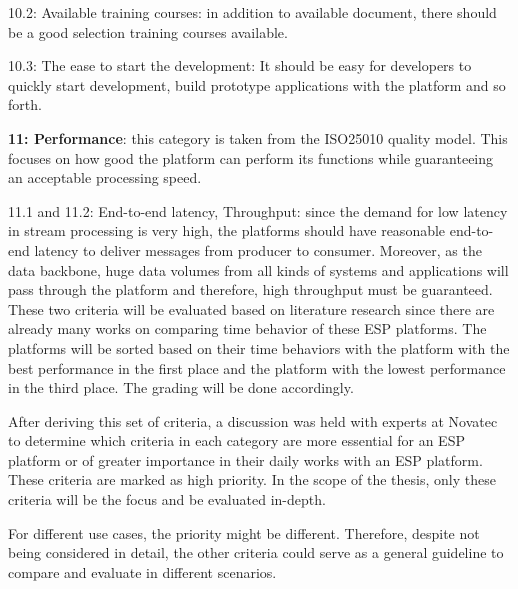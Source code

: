 10.2: Available training courses: in addition to available document, there should be a good selection training courses available. 

10.3: The ease to start the development: It should be easy for developers to quickly start development, build prototype applications with the platform and so forth.

\textbf{11: Performance}: this category is taken from the ISO25010 quality model. This focuses on how good the platform can perform its functions while guaranteeing an acceptable processing speed. 

11.1 and 11.2: End-to-end latency, Throughput: since the demand for low latency in stream processing is very high, the platforms should have reasonable end-to-end latency to deliver messages from producer to consumer. Moreover, as the data backbone, huge data volumes from all kinds of systems and applications will pass through the platform and therefore, high throughput must be guaranteed. These two criteria will be evaluated based on literature research since there are already many works on comparing time behavior of these ESP platforms. The platforms will be sorted based on their time behaviors with the platform with the best performance in the first place and the platform with the lowest performance in the third place. The grading will be done accordingly.

After deriving this set of criteria, a discussion was held with experts at Novatec to determine which criteria in each category are more essential for an ESP platform or of greater importance in their daily works with an ESP platform. These criteria are marked as high priority. In the scope of the thesis, only these criteria will be the focus and be evaluated in-depth. 

For different use cases, the priority might be different. Therefore, despite not being considered in detail, the other criteria could serve as a general guideline to compare and evaluate in different scenarios. 

